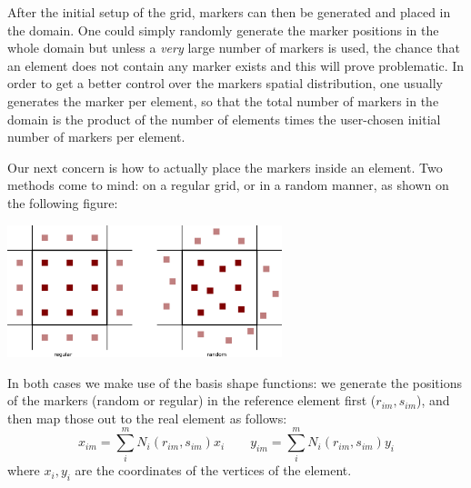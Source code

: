 



After the initial setup of the grid, markers can then be generated and placed in the domain. One could simply randomly generate 
the marker positions in the whole domain but unless a {\it very} large number of markers is used, the chance that an element does 
not contain any marker exists and this will prove problematic. In order to get a better control over the markers spatial distribution, 
one usually generates the marker per element, so that the total number of markers in the domain is the product of the number of 
elements times the user-chosen initial number of markers per element. 

Our next concern is how to actually place the markers inside an element. Two methods come to mind: on a regular grid, or in a random manner, 
as shown on the following figure:

\begin{center}
\includegraphics[width=8cm]{python_codes/fieldstone_13/markers} 
\end{center}

In both cases we make use of the basis shape functions: we generate the positions of the markers (random or regular) in the reference
element first ($r_{im},s_{im}$), and then map those out to the real element as follows:
\[
x_{im}=\sum_i^m N_i(r_{im},s_{im}) x_i
\quad\quad
y_{im}=\sum_i^m N_i(r_{im},s_{im}) y_i
\]
where $x_i,y_i$ are the coordinates of the vertices of the element.


